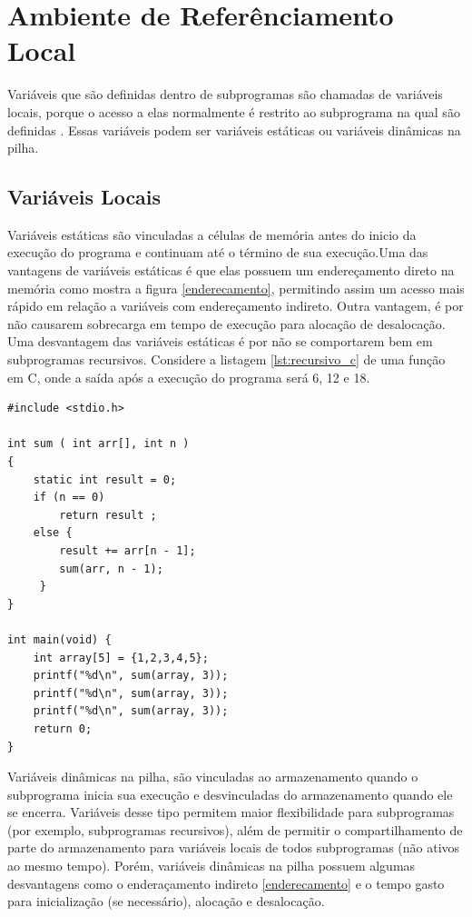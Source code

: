 \section{Ambiente de Referênciamento Local} 
\label{sec:ambiente_de_referenciamento_local}
Variáveis que são definidas dentro de subprogramas são chamadas de variáveis locais, porque o acesso a elas normalmente é restrito ao subprograma na qual são definidas \cite{sebesta}. Essas variáveis podem ser variáveis estáticas ou variáveis dinâmicas na pilha.

\subsection{Variáveis Locais}
\label{sub:variaveis_locais}
Variáveis estáticas são vinculadas a células de memória antes do inicio da execução do programa e continuam até o término de sua execução.Uma das vantagens de variáveis estáticas é que elas possuem um endereçamento direto na memória como mostra a figura \ref{enderecamento}, permitindo assim um acesso mais rápido em relação a variáveis com endereçamento indireto. Outra vantagem, é por não causarem sobrecarga em tempo de execução para alocação de desalocação. Uma desvantagem das variáveis estáticas é por não se comportarem bem em subprogramas recursivos. Considere a listagem \ref{lst:recursivo_c} de uma função em C, onde a saída após a execução do programa será 6, 12 e 18.

\begin{lstlisting}[caption={Programa recursivo com variável estática}, label={lst:recursivo_c}]
#include <stdio.h>

int sum ( int arr[], int n )
{
    static int result = 0;
    if (n == 0)
        return result ;
    else {
        result += arr[n - 1];
        sum(arr, n - 1);
     }
}

int main(void) {
    int array[5] = {1,2,3,4,5};
    printf("%d\n", sum(array, 3));
    printf("%d\n", sum(array, 3));
    printf("%d\n", sum(array, 3));
    return 0;
}
\end{lstlisting}

Variáveis dinâmicas na pilha, são vinculadas ao armazenamento quando o subprograma inicia sua execução e desvinculadas do armazenamento quando ele se encerra. Variáveis desse tipo permitem maior flexibilidade para subprogramas (por exemplo, subprogramas recursivos), além de permitir o compartilhamento de parte do armazenamento para variáveis locais de todos subprogramas (não ativos ao mesmo tempo). Porém, variáveis dinâmicas na pilha possuem algumas desvantagens como o enderaçamento indireto \ref{enderecamento} e o tempo gasto para inicialização (se necessário), alocação e desalocação. 

